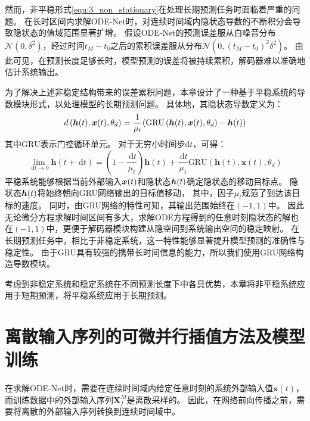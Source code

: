 然而，非平稳形式\eqref{equ:3_non_stationary}在处理长期预测任务时面临着严重的问题。
在长时区间内求解ODE-Net时，对连续时间域内隐状态导数的不断积分会导致隐状态的值域范围显著扩增。
假设ODE-Net的预测误差服从白噪音分布$\mathcal{N}(0,\delta^2)$，经过时间$t_M-t_0$之后的累积误差服从分布$\mathcal{N}(0,(t_M-t_0)^2\delta^2)$。
由此可见，在预测长度足够长时，模型预测的误差将被持续累积，解码器难以准确地估计系统输出。

为了解决上述非稳定结构带来的误差累积问题，本章设计了一种基于平稳系统的导数模块形式，以处理模型的长期预测问题。
具体地，其隐状态导数定义为：
\begin{equation}
\label{equ:stationary}
d\left(\boldsymbol{h}(t), \boldsymbol{x}(t), \theta_{d}\right)=\frac{1}{\mu _t}(\text{GRU}\left(\boldsymbol{h}(t), \boldsymbol{x}(t), \theta_{d}\right)-\boldsymbol h(t))
\end{equation}
其中$\text{GRU}$表示门控循环单元。
对于无穷小时间步$\text{d}t$，可得：
\begin{equation}
    \lim_{\mathrm{~d}t \rightarrow 0}\boldsymbol{h}(t+\mathrm{~d}t) =(1-\frac{\mathrm{~d}t}{\mu _t})\boldsymbol{h}(t)+\frac{\mathrm{~d}t}{\mu _t}\text{GRU}\left(\boldsymbol{h}(t), \boldsymbol{x}(t), \theta_{d}\right)
\end{equation}
平稳系统能够根据当前外部输入$\boldsymbol x(t)$和隐状态$\boldsymbol h(t)$确定隐状态的移动目标点。
隐状态$\boldsymbol h (t)$将始终朝向GRU网络输出的目标值移动，
其中，因子$\mu_t$规范了到达该目标的速度。
同时，由GRU网络的特性可知，其输出范围始终在$(-1,1)$中。
因此无论微分方程求解时间区间有多大，求解ODE方程得到的任意时刻隐状态的解也在$(-1,1)$中，更便于解码器模块构建从隐空间到系统输出空间的稳定映射。
在长期预测任务中，相比于非稳定系统，这一特性能够显著提升模型预测的准确性与稳定性。
由于GRU具有较强的携带长时间信息的能力，所以我们使用GRU网络构造导数模块。

考虑到非稳定系统和稳定系统在不同预测长度下中各具优势，本章将非平稳系统应用于短期预测，将平稳系统应用于长期预测。
\section{离散输入序列的可微并行插值方法及模型训练}
\label{sec:3_interpolation_training}
在求解ODE-Net时，需要在连续时间域内给定任意时刻的系统外部输入值$\boldsymbol x(t)$，
而训练数据中的外部输入序列$\boldsymbol X_f^M$是离散采样的。
因此，在网络前向传播之前，需要将离散的外部输入序列转换到连续时间域中。

